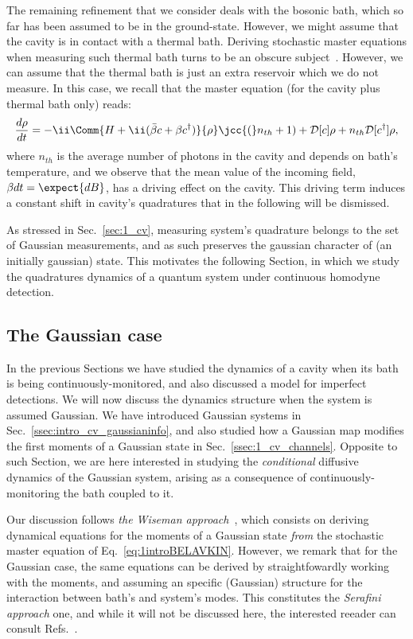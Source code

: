The remaining refinement that we consider deals with the bosonic bath, which so far has been assumed to be in the ground-state. However, we might assume that the cavity is in contact with a thermal bath. Deriving stochastic master equations when measuring such thermal bath turns to be an obscure subject~\cite{wisemanbook,jacobs_2014}. However, we can assume that the thermal bath is just an extra reservoir which we do not measure. In this case, we recall that the master equation (for the cavity plus thermal bath only) reads:
\begin{align}\label{eq:master_thermal}
\frac{d\rho}{dt} = -\ii\Comm{H + \ii(\bar{\beta} c + \beta c^\dagger)}{\rho}\jcc{(}n_{th}+1) + \mathcal{D}[c] \rho + n_{th} \mathcal{D}[c^\dagger] \rho,
\end{align}
where $n_{th}$ is the average number of photons in the cavity and depends on bath's temperature, and we observe that the mean value of the incoming field, $\beta dt = \expect{dB}$, has a driving effect on the cavity\cite{wisemanbook}. This driving term induces a constant shift in cavity's quadratures that in the following will be dismissed.

As stressed in Sec.~\ref{sec:1_cv}, measuring system's quadrature belongs to the set of Gaussian measurements, and as such preserves the gaussian character of (an initially gaussian) state. This motivates the following Section, in which we study the quadratures dynamics of a quantum system under continuous homodyne detection.

\subsection{The Gaussian case}\label{ssec:1_cmon_gaussian}
In the previous Sections we have studied the dynamics of a cavity when its bath is being continuously-monitored, and also discussed a model for imperfect detections. We will now discuss the dynamics structure when the system is assumed Gaussian. We have introduced Gaussian systems in Sec.~\ref{ssec:intro_cv_gaussianinfo}, and also studied how a Gaussian map modifies the first moments of a Gaussian state in Sec.~\ref{ssec:1_cv_channels}. Opposite to such Section, we are here interested in studying the \textit{conditional} diffusive dynamics of the Gaussian system, arising as a consequence of continuously-monitoring the bath coupled to it.

Our discussion follows \textit{the Wiseman approach}~\cite{wisemanbook,Wiseman2005optimal,wiseman1993interpretation}, which consists on deriving dynamical equations for the moments of a Gaussian state \textit{from} the stochastic master equation of Eq.~\ref{eq:1introBELAVKIN}. However, we remark that for the Gaussian case, the same equations can be derived by straightfowardly working with the moments, and assuming an specific (Gaussian) structure for the interaction between bath's and system's modes. This constitutes the \textit{Serafini approach} one, and while it will not be discussed here, the interested reeader can consult Refs.~\cite{serafiniBOOK,Genoni2016conditional}.

